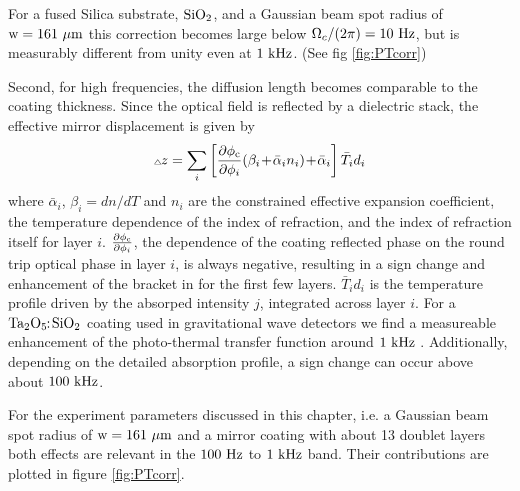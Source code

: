 For a fused Silica substrate, $\rm SiO_2$,  and a Gaussian beam spot radius of ${\rm w}=161~\mu{\rm m}$ this correction becomes large below ${{\Omega}}_c/(2 \pi) = 10~{\rm Hz}$, but is measurably different from unity even at $1~{\rm kHz}$. (See fig \ref{fig:PTcorr})

Second, for high frequencies, the diffusion length becomes comparable to the coating thickness. Since the optical field is reflected by a dielectric stack, the effective mirror displacement is given by \cite{PhysRevD.78.102003,PhysRevD.91.023010}
\begin{equation}
\label{eq:dphic2}
{}_{{}^\triangle}\! z =  \sum_{i}   \left[ \frac{\partial \phi_{\rm c}}{\partial \phi_i} (\beta_i \!+\! \bar{\alpha}_i n_i) 
\!+\!  \bar{\alpha}_i  \right]  \bar{T}_i d_i
\end{equation}
where  $\bar{\alpha}_i$, $\beta_i=dn/dT$ and $n_i$ are the constrained effective expansion coefficient, the temperature dependence of the index of refraction, and the index of refraction itself for layer $i$. $\frac{\partial \phi_{\rm c}}{\partial \phi_i}$, the dependence of the coating reflected phase on the round trip optical phase in layer $i$, is always negative, resulting in a sign change and enhancement of the bracket in  for the first few layers. $\bar{T}_i d_i$ is the temperature profile driven by the absorped intensity $j$, integrated across layer $i$. For a $\rm Ta_2O_5\!\!:\!SiO_2$ coating used in gravitational wave detectors we find a measureable enhancement of the photo-thermal transfer function around $1~{\rm kHz}$ \cite{PhysRevD.91.023010}. Additionally, depending on the detailed absorption profile, a sign change can occur above about $100~{\rm kHz}$.

For the experiment parameters discussed in this chapter, i.e. a  Gaussian beam spot radius of ${\rm w}=161~\mu{\rm m}$ and a mirror coating with about 13 doublet layers both effects are relevant in the $100~{\rm Hz}$ to $1~{\rm kHz}$ band. Their contributions are plotted in figure \ref{fig:PTcorr}.

